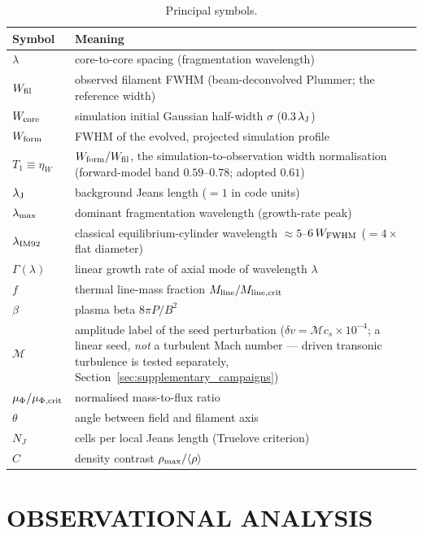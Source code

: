 \documentclass[usenatbib,twoside,twocolumn]{mnras}
\begin{document}
\begin{table}
\caption{Principal symbols.}
\label{tab:symbols}
\footnotesize
\setlength{\tabcolsep}{4pt}
\begin{tabular}{lp{6.1cm}}
\toprule
Symbol & Meaning \\
\midrule
$\lambda$ & core-to-core spacing (fragmentation wavelength) \\
$W_{\rm fil}$ & observed filament FWHM (beam-deconvolved Plummer; the reference width) \\
$W_{\rm core}$ & simulation initial Gaussian half-width $\sigma$ ($0.3\,\lambda_{\rm J}$) \\
$W_{\rm form}$ & FWHM of the evolved, projected simulation profile \\
$T_1\!\equiv\!\eta_W$ & $W_{\rm form}/W_{\rm fil}$, the simulation-to-observation width normalisation (forward-model band $0.59$--$0.78$; adopted $0.61$) \\
$\lambda_{\rm J}$ & background Jeans length ($=1$ in code units) \\
$\lambda_{\rm max}$ & dominant fragmentation wavelength (growth-rate peak) \\
$\lambda_{\rm IM92}$ & classical equilibrium-cylinder wavelength $\approx5$--$6\,W_{\rm FWHM}$ ($=4\times$ flat diameter) \\
$\Gamma(\lambda)$ & linear growth rate of axial mode of wavelength $\lambda$ \\
$f$ & thermal line-mass fraction $M_{\rm line}/M_{\rm line,crit}$ \\
$\beta$ & plasma beta $8\pi P/B^2$ \\
$\mathcal{M}$ & amplitude label of the seed perturbation ($\delta v=\mathcal{M}c_s\times10^{-4}$; a linear seed, \emph{not} a turbulent Mach number --- driven transonic turbulence is tested separately, Section~\ref{sec:supplementary_campaigns}) \\
$\mu_\Phi/\mu_{\Phi,\rm crit}$ & normalised mass-to-flux ratio \\
$\theta$ & angle between field and filament axis \\
$N_J$ & cells per local Jeans length (Truelove criterion) \\
$C$ & density contrast $\rho_{\rm max}/\langle\rho\rangle$ \\
\bottomrule
\end{tabular}
\end{table}

\section{OBSERVATIONAL ANALYSIS}
\end{document}
